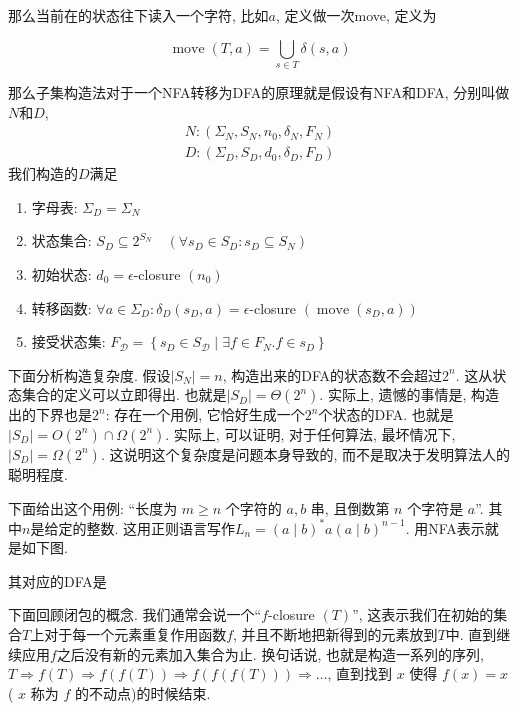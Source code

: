 \documentclass{ctexart}
\begin{document}
\begin{definition}[move描述]
    那么当前在的状态往下读入一个字符, 比如$a$, 定义做一次move, 定义为

    $$\operatorname{move}(T, a)=\bigcup_{s \in T} \delta(s, a)$$ 
\end{definition}

那么子集构造法对于一个NFA转移为DFA的原理就是假设有NFA和DFA, 分别叫做$N$和$D$, 
$$\begin{array}{r}N:\left(\Sigma_N, S_N, n_0, \delta_N, F_N\right) \\ D:\left(\Sigma_D, S_D, d_0, \delta_D, F_D\right)\end{array}$$
我们构造的$D$满足
\begin{enumerate}
    \item 字母表: $\Sigma_D=\Sigma_N$
    \item 状态集合: $S_D \subseteq 2^{S_N} \quad\left(\forall s_D \in S_D: s_D \subseteq S_N\right)$
    \item 初始状态: $d_0=\epsilon$-closure $\left(n_0\right)$
    \item 转移函数: $\forall a \in \Sigma_D: \delta_D\left(s_D, a\right)=\epsilon$-closure $\left(\operatorname{move}\left(s_D, a\right)\right)$
    \item 接受状态集: $F_{\mathcal{D}}=\left\{s_D \in S_{\mathcal{D}} \mid \exists f \in F_N . f \in s_D\right\}$
\end{enumerate}

下面分析构造复杂度. 假设$\left|S_N\right|=n$, 构造出来的DFA的状态数不会超过$2^n$. 这从状态集合的定义可以立即得出. 也就是$\left|S_D\right|=\Theta\left(2^n\right)$. 实际上, 遗憾的事情是, 构造出的下界也是$2^n$: 存在一个用例, 它恰好生成一个$2^n$个状态的DFA. 也就是 $\left|S_D\right|=O\left(2^n\right) \cap \Omega\left(2^n\right)$. 实际上, 可以证明, 对于任何算法, 最坏情况下, $\left|S_D\right|=\Omega\left(2^n\right)$. 这说明这个复杂度是问题本身导致的, 而不是取决于发明算法人的聪明程度. 

下面给出这个用例: ``长度为 $m \geq n$ 个字符的 $a, b$ 串, 且倒数第 $n$ 个字符是 $a$''. 其中$n$是给定的整数. 这用正则语言写作$L_n=(a \mid b)^* a(a \mid b)^{n-1}$. 用NFA表示就是如下图. 


其对应的DFA是


下面回顾闭包的概念. 我们通常会说一个``$f$-closure $(T)$'', 这表示我们在初始的集合$T$上对于每一个元素重复作用函数$f$, 并且不断地把新得到的元素放到$T$中. 直到继续应用$f$之后没有新的元素加入集合为止. 换句话说, 也就是构造一系列的序列, $T \Longrightarrow f(T) \Longrightarrow f(f(T)) \Longrightarrow f(f(f(T))) \Longrightarrow \ldots$, 直到找到 $x$ 使得 $f(x)=x$ ( $x$ 称为 $f$ 的不动点)的时候结束. 
\end{document}
